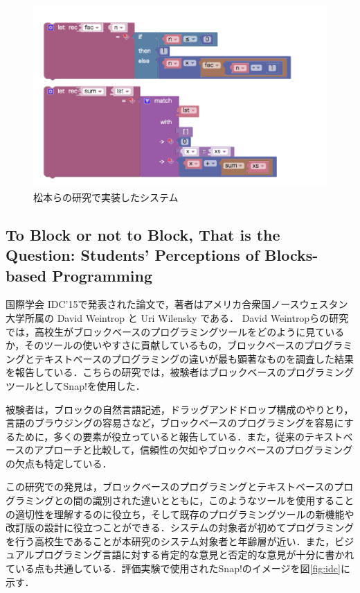 \documentclass{risepaper}
\begin{document}
\begin{figure}[h]
\begin{center}
\includegraphics[scale=0.8]{img/otya.PNG}
\caption{松本らの研究で実装したシステム}%
\label{fig:otya}
\end{center}%
\end{figure}%

	\subsection{To Block or not to Block, That is the Question: Students’ Perceptions of Blocks-based Programming}
    
国際学会 IDC'15で発表された論文\cite{idc}で，著者はアメリカ合衆国ノースウェスタン大学所属の David Weintrop と Uri Wilensky である．
David Weintropらの研究では，高校生がブロックベースのプログラミングツールをどのように見ているか，そのツールの使いやすさに貢献しているもの，ブロックベースのプログラミングとテキストベースのプログラミングの違いが最も顕著なものを調査した結果を報告している．こちらの研究では，被験者はブロックベースのプログラミングツールとしてSnap!を使用した．

被験者は，ブロックの自然言語記述，ドラッグアンドドロップ構成のやりとり，言語のブラウジングの容易さなど，ブロックベースのプログラミングを容易にするために，多くの要素が役立っていると報告している．また，従来のテキストベースのアプローチと比較して，信頼性の欠如やブロックベースのプログラミングの欠点も特定している．

この研究での発見は，ブロックベースのプログラミングとテキストベースのプログラミングとの間の識別された違いとともに，このようなツールを使用することの適切性を理解するのに役立ち，そして既存のプログラミングツールの新機能や改訂版の設計に役立つことができる．システムの対象者が初めてプログラミングを行う高校生であることが本研究のシステム対象者と年齢層が近い．また，ビジュアルプログラミング言語に対する肯定的な意見と否定的な意見が十分に書かれている点も共通している．評価実験で使用されたSnap!のイメージを図\ref{fig:idc}に示す．
\end{document}
